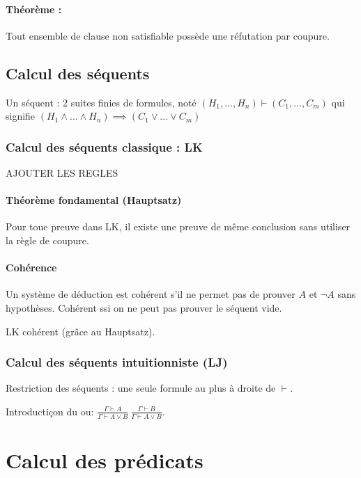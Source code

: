 \documentclass[french]{article}
\begin{document}
\paragraph{Théorème :} Tout ensemble de clause non satisfiable possède une réfutation par coupure.

\subsection{Calcul des séquents}
Un séquent : 2 suites finies de formules, noté  $(H_1,\dots , H_n)\vdash (C_1,\dots , C_m)$ qui signifie $(H_1\wedge\dots\wedge H_n)\implies (C_1\vee\dots\vee C_m)$

\subsubsection{Calcul des séquents classique : LK}
AJOUTER LES REGLES

\paragraph{Théorème fondamental (Hauptsatz)}
Pour toue preuve dans LK, il existe une preuve de même conclusion sans utiliser la règle de coupure.

\paragraph{Cohérence} Un système de déduction est cohérent s'il ne permet pas de prouver $A$ et $\neg A$ sans hypothèses. Cohérent ssi on ne peut pas prouver le séquent vide.

LK cohérent (grâce au Hauptsatz).

\subsubsection{Calcul des séquents intuitionniste (LJ)}
Restriction des séquents : une seule formule au plus à droite de $\vdash$.

Introductiçon du ou:
$\frac{\Gamma\vdash A}{\Gamma\vdash A\vee B}\ \frac{\Gamma\vdash B}{\Gamma\vdash A\vee B}$.

\section{Calcul des prédicats}
\end{document}
